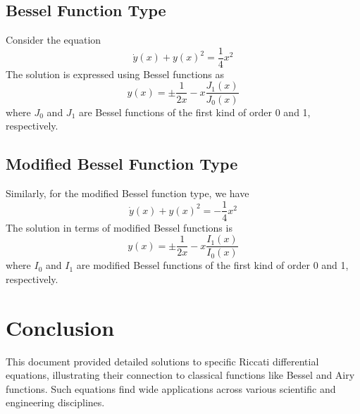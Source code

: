\documentclass{article}
\begin{document}
\subsection{Bessel Function Type}

Consider the equation
\begin{equation}
  \dot{y} (x) + y (x)^2 = \frac{1}{4} x^2
\end{equation}
The solution is expressed using Bessel functions as
\begin{equation}
  y (x) = \pm \frac{1}{2 x} - x \frac{J_1 (x)}{J_0 (x)}
\end{equation}
where $J_0$ and $J_1$ are Bessel functions of the first kind of order 0 and 1,
respectively.

\subsection{Modified Bessel Function Type}

Similarly, for the modified Bessel function type, we have
\begin{equation}
  \dot{y} (x) + y (x)^2 = - \frac{1}{4} x^2
\end{equation}
The solution in terms of modified Bessel functions is
\begin{equation}
  y (x) = \pm \frac{1}{2 x} - x \frac{I_1 (x)}{I_0 (x)}
\end{equation}
where $I_0$ and $I_1$ are modified Bessel functions of the first kind of order
0 and 1, respectively.

\section{Conclusion}

This document provided detailed solutions to specific Riccati differential
equations, illustrating their connection to classical functions like Bessel
and Airy functions. Such equations find wide applications across various
scientific and engineering disciplines.
\end{document}
